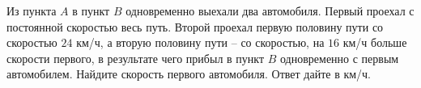 \begin{ex}
	\begin{condition}
		Из пункта \( A \) в пункт \( B \) одновременно выехали два автомобиля. Первый проехал с постоянной скоростью весь путь. Второй проехал первую половину пути со скоростью \( 24 \) км/ч, а вторую половину пути – со скоростью, на \( 16 \) км/ч больше скорости первого, в результате чего прибыл в пункт \( B \) одновременно с первым автомобилем. Найдите скорость первого автомобиля. Ответ дайте в км/ч.
	\end{condition}
\end{ex}
